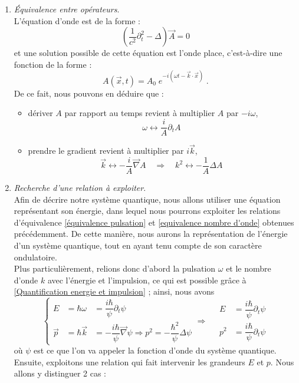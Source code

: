 \documentclass[../notesdecours]{subfiles}
\begin{document}
\begin{enumerate}[label =  (\alph*)]
\item \textit{Équivalence entre opérateurs}. \\
L'équation d'onde est de la forme : 
$$\left(\dfrac{1}{c^2} \partial_t ^2 - \Delta \right) \vec A = 0$$
et une solution possible de cette équation est l'onde place, c'est-à-dire une fonction de la forme : $$
A(\vec{x}, t) = A_0 \; e^{-i(\omega t - \vec k \cdot \vec x)} \; .$$
De ce fait, nous pouvons en déduire que : 
\begin{itemize}
\item dériver $A$ par rapport au temps revient à multiplier $A$ par $-i\omega$,
\begin{equation}
\label{équivalence pulsation}
  \boxed{\omega \longleftrightarrow \dfrac{i}{A} \partial_t A} \; 
\end{equation}
\item prendre le gradient revient à multiplier par $i\vec k$, 
\begin{equation}
\label{equivalence nombre d'onde}
  \vec k \longleftrightarrow -\dfrac{i}{A} \vec \nabla A \quad \Rightarrow \quad \boxed{k^2 \longleftrightarrow -\dfrac{1}{A} \Delta A} \; 
\end{equation}
\end{itemize}

\item \textit{Recherche d'une relation à exploiter}. \\
Afin de décrire notre système quantique, nous allons utiliser une équation représentant son énergie, dans lequel nous pourrons exploiter les relations d'équivalence \ref{équivalence pulsation} et \ref{equivalence nombre d'onde} obtenues précédemment. 
De cette manière, nous aurons la représentation de l'énergie d'un système quantique, tout en ayant tenu compte de son caractère ondulatoire.\\

Plus particulièrement, relions donc d'abord la pulsation $\omega$ et le nombre d'onde $k$ avec l'énergie et l'impulsion, ce qui est possible grâce à \ref{Quantification energie et impulsion} ; ainsi, nous avons 
\begin{equation} \label{eq:ch2-correspondance}
  \left\{ \begin{array}{lll}
  E &= \hbar \omega &= \dfrac{i\hbar}{\psi} \partial_t \psi \\
  \vec p &= \hbar \vec k &= -\dfrac{i\hbar}{\psi} \vec \nabla \psi \Rightarrow p^2 = -\dfrac{\hbar ^2}{\psi} \Delta \psi
  \end{array} \right. \Longrightarrow \quad \boxed{\begin{array}{ll}
  E &=\dfrac{i\hbar}{\psi} \partial_t \psi \\
  p^2 &=  \dfrac{i\hbar}{\psi} \partial_t \psi
  \end{array}}
  \end{equation}
où $\psi$ est ce que l'on va appeler la fonction d'onde du système quantique. 
Ensuite, exploitons une relation qui fait intervenir les grandeurs $E$ et $p$. Nous allons y distinguer 2 cas :


\end{enumerate}
\end{document}
